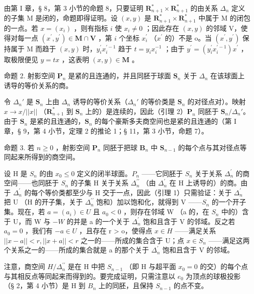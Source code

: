由第 I 章，§ 8，第 3 小节的命题 8，只要证明 \(\mathbf{R}_{n+1}^{*}\times\mathbf{R}_{n+1}^{*}\) 的由关系 \(\Delta_{n}\) 定义的子集 M 是闭的，命题即得证明。设 \((x,y)\) 是 \(\mathbf{R}_{n+1}^{*}\times\mathbf{R}_{n+1}^{*}\) 中属于 M 的闭包的一点。若 \(x=(x_{i})\) ，则有指标 \(i\) 使 \(x_{i}\neq0\) ；因此存在 \((x,y)\) 的邻域 V，使得对每一点 \((x^{\prime},y^{\prime})\in\mathbf{M}\cap\mathbf{V}\) ，第 \(i\) 个坐标 \(x_{i}^{\prime}\) （\(x^{\prime}\) 的）不是 o。当 \((x^{\prime},y^{\prime})\) 保持属于 M 而趋于 \((x,y)\) 时，\(y_{i}^{\prime}x_{i}^{\prime-1}\) 趋于 \(t=y_{i}x_{i}^{-1}\) ；由于 \(y^{\prime}=(y_{i}^{\prime}x_{i}^{\prime-1})x^{\prime}\) ，取极限便见 \(y=tx\) ，这表明 \((x,y)\in\mathbf{M}\) 。

命题 2. 射影空间 \(\mathbf{P}_{n}\) 是紧的且连通的，并且同胚于球面 \(\mathbf{S}_{n}\) 关于 \(\Delta_{n}\) 在该球面上诱导的等价关系的商。

令 \(\Delta_n'\) 是 \(\mathbf{S}_n\) 上由 \(\Delta_n\) 诱导的等价关系（\(\Delta_n'\) 的等价类是 \(\mathbf{S}_n\) 的对径点对）。映射 \(x \to x/||x||\) （\(\mathbf{R}_{n+1}^*\) 到 \(\mathbf{S}_n\) 上的）是连续的，因此（引理 2）\(\mathbf{P}_n\) 同胚于 \(\mathbf{S}_n/\Delta_n'\)。由于 \(\mathbf{S}_n\) 是紧的且连通的，\(\mathbf{S}_n\) 的每个豪斯多夫商空间也是紧的且连通的（第 I 章，§ 9，第 4 小节，定理 2 的推论 1；§ 11，第 3 小节，命题 7）。

命题 3. 若 \(n \geqslant 0\) ，射影空间 \(\mathbf{P}_n\) 同胚于把球 \(\mathbf{B}_n\) 中 \(\mathbf{S}_{n-1}\) 的每个点与其对径点等同起来所得到的商空间。

设 H 是 \(S_{n}\) 的由 \(x_{0} \leqslant 0\) 定义的闭半球面。\(P_{n}\) ——它同胚于 \(S_{n}\) 关于关系 \(\Delta_{n}^{\prime}\) 的商空间——也同胚于 \(S_{n}\) 的子集 H 关于关系 \(\Delta_{n}^{\prime\prime}\) （由 \(\Delta_{n}^{\prime}\) 在 H 上诱导的）的商。由于 \(\Delta_{n}^{\prime}\) 的每个等价类都至少与 H 交于一点，因此（引理 1）只需验证：关于 \(\Delta_{n}^{\prime}\) 把 U （H 的开子集，关于 \(\Delta_{n}^{\prime\prime}\) 饱和）加以饱和化，就得到 V ——\(S_{n}\) 的一个开子集。现在，若 \(a = (a_{i}) \in U\) 且 \(a_{0} < 0\) ，则存在邻域 W （a 的，在 \(S_{n}\) 中的）含于 U，而 W 与 \(-W\) 的并是 a 的一个关于 \(\Delta_{n}^{\prime}\) 饱和且含于 V 的邻域。反之若 \(a_{0} = 0\) ，我们有 \(- a \in U\) ，且存在 r \textgreater{} o，使得点 \(x \in H\) ——满足关系 \(||x-a||<r, ||x+a||<r\) 之一的——所成的集合含于 U；点 \(x\in S_{n}\) ——满足这两个关系之一的——所成的集合就是 a 的那个关于 \(\Delta_{n}^{\prime}\) 饱和且含于 V 的邻域。

注意，商空间 \(H/\Delta_{n}^{\prime\prime}\) 是在 H 中把 \(S_{n-1}\) （即 H 与超平面 \(x_{0}=0\) 的交）的每个点与其相反点等同起来而得到的。要完成证明，只需注意以 \(e_{0}\) 为顶点的球极投影（§ 2，第 4 小节）是 H 到 \(B_{n}\) 上的同胚，且保持 \(S_{n-1}\) 的点不变。

